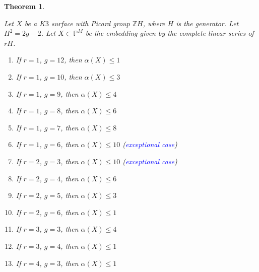 \documentclass[11pt,twoside]{amsart}
\theoremstyle{plain}
\numberwithin{equation}{section}
\newtheorem{theorem}{Theorem}[section]
\theoremstyle{definition}
\begin{document}
\begin{theorem}\label{ZL for lower genus $K3$ surfaces}

Let $X$ be a $K3$ surface with Picard group $\mathbb{Z}H$, where $H$ is the generator. Let $H^2 = 2g-2$. Let $X \subset \mathbb{P}^M$ be the embedding given by the complete linear series of $rH$. 
    \begin{enumerate}
        \item If $r = 1$, $g = 12$, then $\alpha(X) \leq 1$
        \item If $r = 1$, $g = 10$, then $\alpha(X) \leq 3$  
        \item If $r = 1$, $g = 9$, then $\alpha(X) \leq 4$
        \item If $r = 1$, $g = 8$, then $\alpha(X) \leq 6$
        \item If $r = 1$, $g = 7$, then $\alpha(X) \leq 8$
        \item If $r = 1$, $g = 6$, then $\alpha(X) \leq 10$ (\textcolor{blue}{exceptional case})
        \item If $r = 2$, $g = 3$, then $\alpha(X) \leq 10$ (\textcolor{blue}{exceptional case})
        \item If $r = 2$, $g = 4$, then $\alpha(X) \leq 6$ 
        \item If $r = 2$, $g = 5$, then $\alpha(X) \leq 3$ 
        \item If $r = 2$, $g = 6$, then $\alpha(X) \leq 1$ 
        \item If $r = 3$, $g = 3$, then $\alpha(X) \leq 4$
        \item If $r = 3$, $g = 4$, then $\alpha(X) \leq 1$ 
        \item If $r = 4$, $g = 3$, then $\alpha(X) \leq 1$
        
       
        
    \end{enumerate}
    
\end{theorem}
\end{document}

